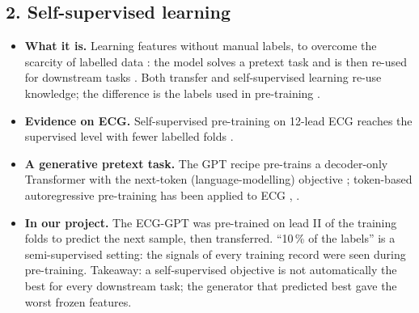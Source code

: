 \subsection*{2. Self-supervised learning}
\begin{itemize}[leftmargin=1.2em,itemsep=1pt]
  \item \textbf{What it is.} Learning features without manual labels, to overcome the scarcity of
        labelled data \cite[p.~1]{soltanieh2022analysis}: the model solves a pretext task and is then
        re-used for downstream tasks \cite{course_summary_0910}. Both transfer and self-supervised
        learning re-use knowledge; the difference is the labels used in pre-training
        \cite{course_summary_0910}.
  \item \textbf{Evidence on ECG.} Self-supervised pre-training on 12-lead ECG reaches the supervised
        level with fewer labelled folds \cite[pp.~7--8]{mehari2022self}.
  \item \textbf{A generative pretext task.} The GPT recipe pre-trains a decoder-only Transformer with the
        next-token (language-modelling) objective \cite[pp.~3,5]{radford2018improving}; token-based
        autoregressive pre-training has been applied to ECG \cite[p.~1]{han2025ecgbyte},
        \cite[p.~1]{yang2025heartllm}.
  \item \textbf{In our project.} The ECG-GPT was pre-trained on lead II of the training folds to predict
        the next sample, then transferred. ``10\,\% of the labels'' is a semi-supervised setting: the
        signals of every training record were seen during pre-training. Takeaway: a self-supervised
        objective is not automatically the best for every downstream task; the generator that predicted
        best gave the worst frozen features.
\end{itemize}

